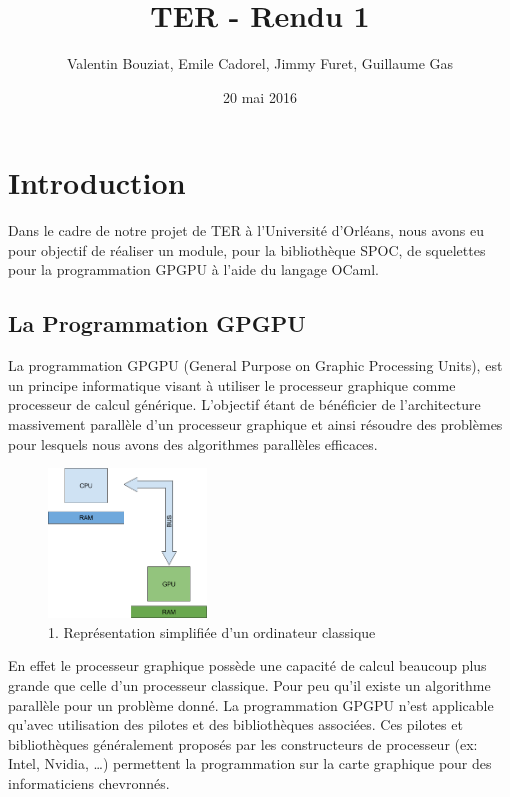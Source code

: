 \documentclass{report}
\title{TER - Rendu 1}
\author{Valentin Bouziat, Emile Cadorel, Jimmy Furet, Guillaume Gas}
\date{20 mai 2016}
\begin{document}
\maketitle

\chapter{Introduction}
Dans le cadre de notre projet de TER à l’Université d’Orléans, nous avons eu pour objectif de réaliser un module, pour la bibliothèque SPOC, de squelettes pour la programmation GPGPU à l’aide du langage OCaml.

\section{La Programmation GPGPU}
La programmation GPGPU\cite{refProgGPGPU} (General Purpose on Graphic Processing Units), est un principe informatique visant à utiliser le processeur graphique comme processeur de calcul générique. L’objectif étant de bénéficier de l’architecture massivement parallèle d’un processeur graphique et ainsi résoudre des problèmes pour lesquels nous avons des algorithmes parallèles efficaces.\newline

\begin{figure}[!h]
\begin{center}
\includegraphics[height=150]{image1.png}
\end{center}
\caption{1. Représentation simplifiée d'un ordinateur classique}
\label{test}
\end{figure} \newline

En effet le processeur graphique possède une capacité de calcul beaucoup plus grande que celle d’un processeur classique. Pour peu qu’il existe un algorithme parallèle pour un problème donné. La programmation GPGPU n’est applicable qu’avec utilisation des pilotes et des bibliothèques associées. Ces pilotes et bibliothèques généralement proposés par les constructeurs de processeur (ex: Intel, Nvidia, …) permettent la programmation sur la carte graphique pour des informaticiens chevronnés.\newline 
\end{document}

